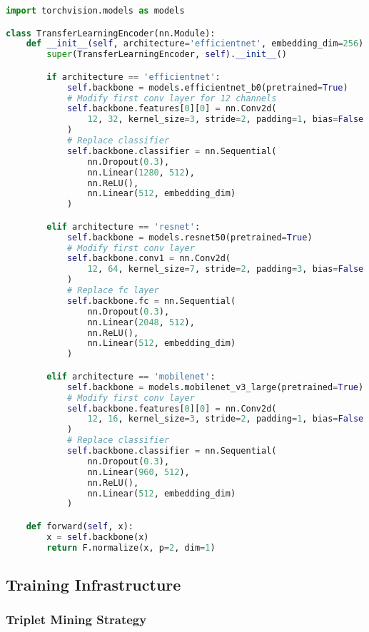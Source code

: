 \begin{lstlisting}[language=Python, caption=Transfer Learning Model Wrapper]
import torchvision.models as models

class TransferLearningEncoder(nn.Module):
    def __init__(self, architecture='efficientnet', embedding_dim=256):
        super(TransferLearningEncoder, self).__init__()

        if architecture == 'efficientnet':
            self.backbone = models.efficientnet_b0(pretrained=True)
            # Modify first conv layer for 12 channels
            self.backbone.features[0][0] = nn.Conv2d(
                12, 32, kernel_size=3, stride=2, padding=1, bias=False
            )
            # Replace classifier
            self.backbone.classifier = nn.Sequential(
                nn.Dropout(0.3),
                nn.Linear(1280, 512),
                nn.ReLU(),
                nn.Linear(512, embedding_dim)
            )

        elif architecture == 'resnet':
            self.backbone = models.resnet50(pretrained=True)
            # Modify first conv layer
            self.backbone.conv1 = nn.Conv2d(
                12, 64, kernel_size=7, stride=2, padding=3, bias=False
            )
            # Replace fc layer
            self.backbone.fc = nn.Sequential(
                nn.Dropout(0.3),
                nn.Linear(2048, 512),
                nn.ReLU(),
                nn.Linear(512, embedding_dim)
            )

        elif architecture == 'mobilenet':
            self.backbone = models.mobilenet_v3_large(pretrained=True)
            # Modify first conv layer
            self.backbone.features[0][0] = nn.Conv2d(
                12, 16, kernel_size=3, stride=2, padding=1, bias=False
            )
            # Replace classifier
            self.backbone.classifier = nn.Sequential(
                nn.Dropout(0.3),
                nn.Linear(960, 512),
                nn.ReLU(),
                nn.Linear(512, embedding_dim)
            )

    def forward(self, x):
        x = self.backbone(x)
        return F.normalize(x, p=2, dim=1)
\end{lstlisting}

\subsection{Training Infrastructure}

\subsubsection{Triplet Mining Strategy}

